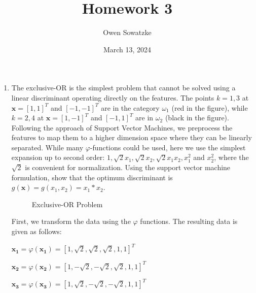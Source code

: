 \documentclass[fleqn]{article}
\title{Homework 3}
\author{Owen Sowatzke}
\date{March 13, 2024}
\newcommand{\zerodisplayskip}{
	\setlength{\abovedisplayskip}{0pt}%
	\setlength{\belowdisplayskip}{0pt}%
	\setlength{\abovedisplayshortskip}{0pt}%
	\setlength{\belowdisplayshortskip}{0pt}%
	\setlength{\mathindent}{0pt}}
\begin{document}
	\offinterlineskip
	\setlength{\lineskip}{12pt}
	\zerodisplayskip
	\maketitle
	
	\begin{enumerate}
		\item The exclusive-OR is the simplest problem that cannot be solved using a linear discriminant operating directly on the features. The points $k=1,3$ at $\mathbf{x} = [1,1]^T$ and $[-1,-1]^T$ are in the category $\omega_1$ (red in the figure), while $k=2,4$ at $\mathbf{x}=[1,-1]^T$ and $[-1,1]^T$ are in $\omega_2$ (black in the figure). Following the approach of Support Vector Machines, we preprocess the features to map them to a higher dimension space where they can be linearly separated. While many $\varphi$-functions could be used, here we use the simplest expansion up to second order: $1, \sqrt{2}x_1, \sqrt{2}x_2, \sqrt{2}x_1x_2, x_1^2$ and $x_2^2$, where the $\sqrt{2}$ is convenient for normalization. Using the support vector machine formulation, show that the optimum discriminant is $g(\mathbf{x}) = g(x_1,x_2) = x_1 * x_2$.
		
	\begin{figure}[H]
		\centerline{}
		\caption{Exclusive-OR Problem}
		\label{exclusive_or}
	\end{figure}
		
	First, we transform the data using the $\varphi$ functions. The resulting data is given as follows:
	
	$\mathbf{x_1} = \varphi(\mathbf{x_1}) = [1,\sqrt{2},\sqrt{2},\sqrt{2},1,1]^T$
	
	$\mathbf{x_2} = \varphi(\mathbf{x_2}) = [1,-\sqrt{2},-\sqrt{2},\sqrt{2},1,1]^T$
	
	$\mathbf{x_3} = \varphi(\mathbf{x_3}) = [1,\sqrt{2},-\sqrt{2},-\sqrt{2},1,1]^T$
	

\end{enumerate}
\end{document}
